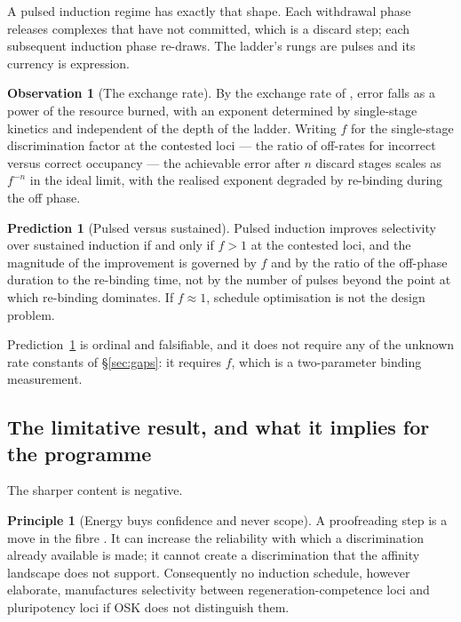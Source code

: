 \documentclass[11pt,a4paper]{article}
\theoremstyle{plain}
\theoremstyle{definition}
\newtheorem{principle}[theorem]{Principle}
\newtheorem{observation}[theorem]{Observation}
\newtheorem{prediction}[theorem]{Prediction}
\theoremstyle{remark}
\begin{document}
A pulsed induction regime has exactly that shape. Each withdrawal phase
releases complexes that have not committed, which is a discard step; each
subsequent induction phase re-draws. The ladder's rungs are pulses and its
currency is expression.

\begin{observation}[The exchange rate]\label{obs:rate}
By the exchange rate of \cite{Proofreading}, error falls as a power of the
resource burned, with an exponent determined by single-stage kinetics and
independent of the depth of the ladder. Writing $f$ for the single-stage
discrimination factor at the contested loci --- the ratio of off-rates for
incorrect versus correct occupancy --- the achievable error after $n$ discard
stages scales as $f^{-n}$ in the ideal limit, with the realised exponent
degraded by re-binding during the off phase.
\end{observation}

\begin{prediction}[Pulsed versus sustained]\label{pred:pulse}
Pulsed induction improves selectivity over sustained induction if and only if
$f > 1$ at the contested loci, and the magnitude of the improvement is
governed by $f$ and by the ratio of the off-phase duration to the re-binding
time, not by the number of pulses beyond the point at which re-binding
dominates. If $f \approx 1$, schedule optimisation is not the design problem.
\end{prediction}

Prediction~\ref{pred:pulse} is ordinal and falsifiable, and it does not
require any of the unknown rate constants of \S\ref{sec:gaps}: it requires
$f$, which is a two-parameter binding measurement.

\subsection{The limitative result, and what it implies for the programme}

The sharper content is negative.

\begin{principle}[Energy buys confidence and never scope]\label{prin:scope}
A proofreading step is a move in the fibre \cite{Proofreading}. It can
increase the reliability with which a discrimination already available is
made; it cannot create a discrimination that the affinity landscape does not
support. Consequently no induction schedule, however elaborate, manufactures
selectivity between regeneration-competence loci and pluripotency loci if OSK
does not distinguish them.
\end{principle}
\end{document}
